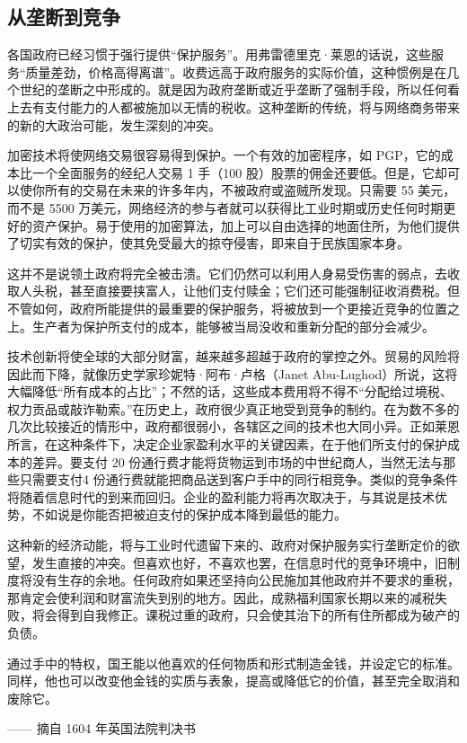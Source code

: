\subsection{从垄断到竞争}
各国政府已经习惯于强行提供“保护服务”。用弗雷德里克·莱恩的话说，这些服务“质量差劲，价格高得离谱”。收费远高于政府服务的实际价值，这种惯例是在几个世纪的垄断之中形成的。就是因为政府垄断或近乎垄断了强制手段，所以任何看上去有支付能力的人都被施加以无情的税收。这种垄断的传统，将与网络商务带来的新的大政治可能，发生深刻的冲突。

加密技术将使网络交易很容易得到保护。一个有效的加密程序，如 PGP，它的成本比一个全面服务的经纪人交易 1 手（100 股）股票的佣金还要低。但是，它却可以使你所有的交易在未来的许多年内，不被政府或盗贼所发现。只需要 55 美元，而不是 5500 万美元，网络经济的参与者就可以获得比工业时期或历史任何时期更好的资产保护。易于使用的加密算法，加上可以自由选择的地面住所，为他们提供了切实有效的保护，使其免受最大的掠夺侵害，即来自于民族国家本身。

这并不是说领土政府将完全被击溃。它们仍然可以利用人身易受伤害的弱点，去收取人头税，甚至直接要挟富人，让他们支付赎金；它们还可能强制征收消费税。但不管如何，政府所能提供的最重要的保护服务，将被放到一个更接近竞争的位置之上。生产者为保护所支付的成本，能够被当局没收和重新分配的部分会减少。

技术创新将使全球的大部分财富，越来越多超越于政府的掌控之外。贸易的风险将因此而下降，就像历史学家珍妮特·阿布·卢格（Janet Abu-Lughod）所说，这将大幅降低“所有成本的占比”；不然的话，这些成本费用将不得不“分配给过境税、权力贡品或敲诈勒索。”在历史上，政府很少真正地受到竞争的制约。在为数不多的几次比较接近的情形中，政府都很弱小，各辖区之间的技术也大同小异。正如莱恩所言，在这种条件下，决定企业家盈利水平的关键因素，在于他们所支付的保护成本的差异。要支付 20 份通行费才能将货物运到市场的中世纪商人，当然无法与那些只需要支付4 份通行费就能把商品送到客户手中的同行相竞争。类似的竞争条件将随着信息时代的到来而回归。企业的盈利能力将再次取决于，与其说是技术优势，不如说是你能否把被迫支付的保护成本降到最低的能力。

这种新的经济动能，将与工业时代遗留下来的、政府对保护服务实行垄断定价的欲望，发生直接的冲突。但喜欢也好，不喜欢也罢，在信息时代的竞争环境中，旧制度将没有生存的余地。任何政府如果还坚持向公民施加其他政府并不要求的重税，那肯定会使利润和财富流失到别的地方。因此，成熟福利国家长期以来的减税失败，将会得到自我修正。课税过重的政府，只会使其治下的所有住所都成为破产的负债。

\begin{tcolorbox}
\kaishu 通过手中的特权，国王能以他喜欢的任何物质和形式制造金钱，并设定它的标准。同样，他也可以改变他金钱的实质与表象，提高或降低它的价值，甚至完全取消和废除它。
\begin{flushright}
—— 摘自 1604 年英国法院判决书  
\end{flushright}
\end{tcolorbox}

